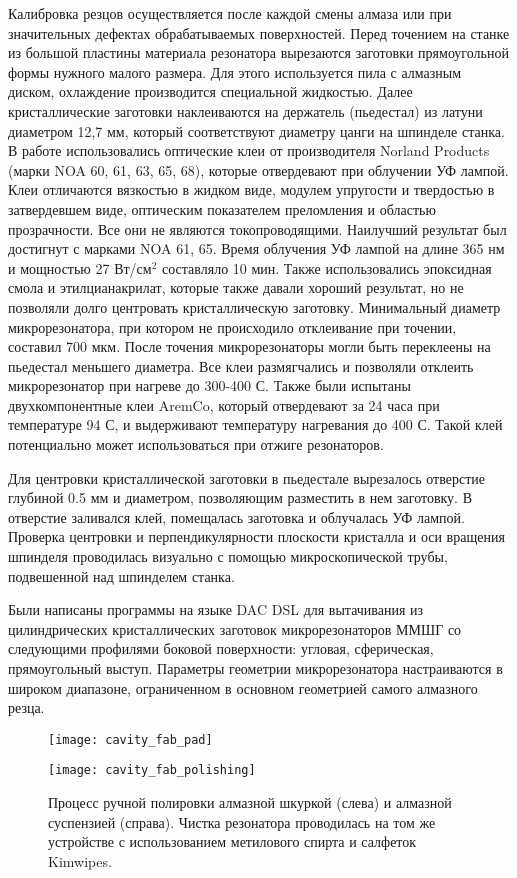 Калибровка резцов осуществляется после каждой смены алмаза или при значительных дефектах обрабатываемых поверхностей.
Перед точением на станке из большой пластины материала резонатора вырезаются заготовки прямоугольной формы нужного малого размера. Для этого используется пила с алмазным диском, охлаждение производится специальной жидкостью.
Далее кристаллические заготовки наклеиваются на держатель (пьедестал) из латуни диаметром 12,7 мм, который соответствуют диаметру цанги на шпинделе станка. В работе использовались оптические клеи от производителя Norland Products (марки NOA 60, 61, 63, 65, 68), которые отвердевают при облучении УФ лампой. Клеи отличаются вязкостью в жидком виде, модулем упругости и твердостью в затвердевшем виде, оптическим показателем преломления и областью прозрачности. Все они не являются токопроводящими. Наилучший результат был достигнут с марками NOA 61, 65. Время облучения УФ лампой на длине 365 нм и мощностью 27 Вт/см$^2$ составляло 10 мин. Также использовались эпоксидная смола и этилцианакрилат, которые также давали хороший результат, но не позволяли долго центровать кристаллическую заготовку. Минимальный диаметр микрорезонатора, при котором не происходило отклеивание при точении, составил 700 мкм.
После точения микрорезонаторы могли быть переклеены на пьедестал меньшего диаметра. Все клеи размягчались и позволяли отклеить микрорезонатор при нагреве до 300-400 С. Также были испытаны двухкомпонентные клеи AremCo, который отвердевают за 24 часа при температуре 94 С, и выдерживают температуру нагревания до 400 С. Такой клей потенциально может использоваться при отжиге резонаторов.

Для центровки кристаллической заготовки в пьедестале вырезалось отверстие глубиной 0.5 мм и диаметром, позволяющим разместить в нем заготовку. В отверстие заливался клей, помещалась заготовка и облучалась УФ лампой. Проверка центровки и перпендикулярности плоскости кристалла и оси вращения шпинделя проводилась визуально с помощью микроскопической трубы, подвешенной над шпинделем станка.

Были написаны программы на языке DAC DSL для вытачивания из цилиндрических кристаллических заготовок микрорезонаторов ММШГ со следующими профилями боковой поверхности: угловая, сферическая, прямоугольный выступ. Параметры геометрии микрорезонатора настраиваются в широком диапазоне, ограниченном в основном геометрией самого алмазного резца.


\begin{figure}[ht]
  \begin{minipage}[ht]{0.49\linewidth}\centering
    \texttt{[image: cavity\_fab\_pad]}
  \end{minipage}
  \hfill
  \begin{minipage}[ht]{0.49\linewidth}\centering
    \texttt{[image: cavity\_fab\_polishing]}
  \end{minipage}
  \caption{Процесс ручной полировки алмазной шкуркой (слева) и алмазной суспензией (справа). Чистка резонатора проводилась на том же устройстве с использованием метилового спирта и салфеток Kimwipes.}
  \label{cavity_fab}
\end{figure}

